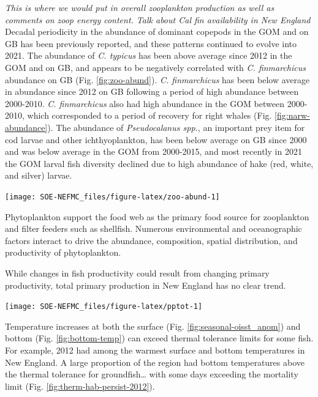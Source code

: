 \documentclass[
  10pt,
]{article}
\let\origfigure\figure
\let\endorigfigure\endfigure
\renewenvironment{figure}[1][2] {
    \expandafter\origfigure\expandafter[H]
} {
    \endorigfigure
}
\begin{document}
\emph{This is where we would put in overall zooplankton production as well as comments on zoop energy content. Talk about Cal fin availability in New England}
Decadal periodicity in the abundance of dominant copepods in the GOM and on GB has been previously reported, and these patterns continued to evolve into 2021. The abundance of \emph{C. typicus} has been above average since 2012 in the GOM and on GB, and appears to be negatively correlated with \emph{C. finmarchicus} abundance on GB (Fig. \ref{fig:zoo-abund}). \emph{C. finmarchicus} has been below average in abundance since 2012 on GB following a period of high abundance between 2000-2010. \emph{C. finmarchicus} also had high abundance in the GOM between 2000-2010, which corresponded to a period of recovery for right whales (Fig. \ref{fig:narw-abundance}). The abundance of \emph{Pseudocalanus spp.}, an important prey item for cod larvae and other ichthyoplankton, has been below average on GB since 2000 and was below average in the GOM from 2000-2015, and most recently in 2021 the GOM larval fish diversity declined due to high abundance of hake (red, white, and silver) larvae.

\begin{figure}

{\centering \texttt{[image: SOE-NEFMC\_files/figure-latex/zoo-abund-1]} 

}

\caption{Abundance Annomalies of three dominante zooplankton (\textit{Calanus finmarchicus}, \textit{Calanus typicus}, and \textit{Pseudocalanus spp}.) on Georges Bank (GB) and the Gulf of Maine (GOM).}\label{fig:zoo-abund}
\end{figure}

Phytoplankton support the food web as the primary food source for zooplankton and filter feeders such as shellfish. Numerous environmental and oceanographic factors interact to drive the abundance, composition, spatial distribution, and productivity of phytoplankton.

While changes in fish productivity could result from changing primary productivity, total primary production in New England has no clear trend.

\begin{center}\texttt{[image: SOE-NEFMC\_files/figure-latex/pptot-1]} \end{center}

Temperature increases at both the surface (Fig. \ref{fig:seasonal-oisst_anom}) and bottom (Fig. \ref{fig:bottom-temp}) can exceed thermal tolerance limits for some fish. For example, 2012 had among the warmest surface and bottom temperatures in New England. A large proportion of the region had bottom temperatures above the thermal tolerance for groundfish\ldots{} with some days exceeding the mortality limit (Fig. \ref{fig:therm-hab-persist-2012}).
\end{document}
